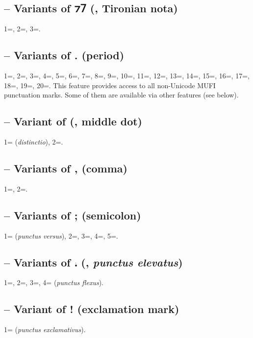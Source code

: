 \subsection{ -- Variants of ⁊⹒
(, Tironian nota)}
1=, 2=, 3=.

\subsection{ --
  Variants of . (period)}
1=, 2=, 3=, 4=, 5=, 6=,
7=, 8=, 9=, 10=, 11=, 12=,
13=, 14=, 15=, 16=, 17=,
18=, 19=, 20=. This
feature provides access to all non-Unicode MUFI punctuation marks. Some of them are available via other features (see
below).

\subsection{ -- Variant of {\textperiodcentered} (, middle dot)}
1= (\textit{distinctio}), 2=.

\subsection{ --
Variants of , (comma)}
1=, 2=.

\subsection{ --
Variants of ; (semicolon)}
1= (\textit{punctus versus}), 2=, 3=, 4=, 5=.

\subsection{ -- Variants of ⹎ (, \textit{punctus elevatus})}
1=, 2=, 3=, 4= (\textit{punctus flexus}).

\subsection{ -- Variant of ! (exclamation mark)}
1= (\textit{punctus exclamativus}).

